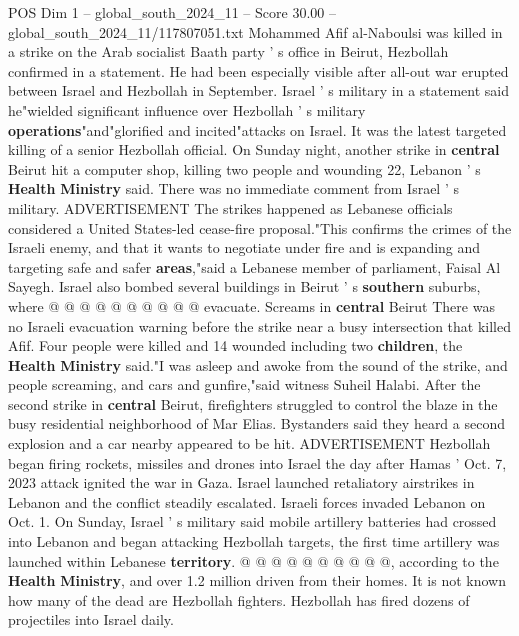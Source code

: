 \begin{textsample}{POS Dim 1 – global\_south\_2024\_11 – Score 30.00 – global\_south\_2024\_11/117807051.txt}  \label{ex:f1_pos_249}
Mohammed Afif al-Naboulsi was killed in a strike on the Arab socialist Baath party ' s office in Beirut, Hezbollah confirmed in a statement.
He had been especially visible after all-out war erupted between Israel and Hezbollah in September.
Israel ' s military in a statement said he"wielded significant influence over Hezbollah ' s military \textbf{operations}"and"glorified and incited"attacks on Israel.
It was the latest targeted killing of a senior Hezbollah official.
On Sunday night, another strike in \textbf{central} Beirut hit a computer shop, killing two people and wounding 22, Lebanon ' s \textbf{Health} \textbf{Ministry} said.
There was no immediate comment from Israel ' s military.
ADVERTISEMENT The strikes happened as Lebanese officials considered a United States-led cease-fire proposal."This confirms the crimes of the Israeli enemy, and that it wants to negotiate under fire and is expanding and targeting safe and safer \textbf{areas},"said a Lebanese member of parliament, Faisal Al Sayegh.
Israel also bombed several buildings in Beirut ' s \textbf{southern} suburbs, where @ @ @ @ @ @ @ @ @ @ evacuate.
Screams in \textbf{central} Beirut There was no Israeli evacuation warning before the strike near a busy intersection that killed Afif.
Four people were killed and 14 wounded including two \textbf{children}, the \textbf{Health} \textbf{Ministry} said."I was asleep and awoke from the sound of the strike, and people screaming, and cars and gunfire,"said witness Suheil Halabi.
After the second strike in \textbf{central} Beirut, firefighters struggled to control the blaze in the busy residential neighborhood of Mar Elias.
Bystanders said they heard a second explosion and a car nearby appeared to be hit.
ADVERTISEMENT Hezbollah began firing rockets, missiles and drones into Israel the day after Hamas ' Oct. 7, 2023 attack ignited the war in Gaza.
Israel launched retaliatory airstrikes in Lebanon and the conflict steadily escalated.
Israeli forces invaded Lebanon on Oct. 1.
On Sunday, Israel ' s military said mobile artillery batteries had crossed into Lebanon and began attacking Hezbollah targets, the first time artillery was launched within Lebanese \textbf{territory}. @ @ @ @ @ @ @ @ @ @, according to the \textbf{Health} \textbf{Ministry}, and over 1.2 million driven from their homes.
It is not known how many of the dead are Hezbollah fighters.
Hezbollah has fired dozens of projectiles into Israel daily.

\end{textsample}
